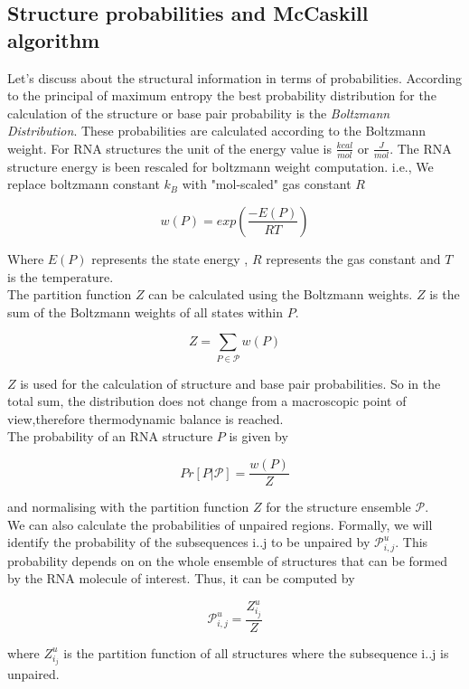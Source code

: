 \documentclass[twoside,a4paper]{report}
\begin{document}
 	 \subsection{Structure probabilities and McCaskill algorithm}
 	 Let's discuss about the structural information in terms of probabilities. According to the principal of maximum entropy \citep{jaynes1957information} the best probability distribution for the calculation of the structure or base pair probability is the \textit{Boltzmann Distribution}. These probabilities are calculated according to the Boltzmann weight. For RNA structures the unit of the energy value is $\frac{kcal}{mol}$ or $\frac{J}{mol}$. The RNA structure energy is been rescaled for boltzmann weight computation. i.e., We replace boltzmann constant $k_B$ with "mol-scaled" gas constant $R$\\
 	 
 	 \begin{center}	 
 	 \[ 
 	 w(P)= exp\left( \frac{-E(P)}{RT} \right)
 	 \]
 	 \end{center}
 	 
 	 Where $E(P)$ represents the state energy , $R $ represents the gas constant and $T$ is the temperature.\\
 	 The partition function $Z$ can be calculated using the Boltzmann weights. $Z$ is the sum of the Boltzmann weights of all states within $P$. \\
 	 \begin{center}	 
 	 	\[ 
 	 	Z= \sum_{P \in \mathcal{P}} w(P)
 	 	\]
 	 \end{center}
 	 
 	 $Z$ is used for the calculation of structure and base pair probabilities. So in the total sum, the distribution does not change from a macroscopic point of view,therefore thermodynamic balance is reached.\\
 	 The probability of an RNA structure $P$ is given by \\  
 	  \begin{center}	 
 	 	\[ 
 	 Pr[P|\mathcal{P}] = \frac{w(P)}{Z} 
 	 	\]
 	 \end{center}
  	 and normalising with the partition function $Z$ for the structure ensemble $\mathcal{P}$.  \\
  	
  	 We can also calculate the probabilities of unpaired regions. Formally, we will identify the probability of the subsequences i..j to be unpaired by $\mathcal{P}_{i,j}^{u}$. This probability depends on  on the whole ensemble of structures that can be formed by the RNA molecule of interest. Thus, it can be computed by\\
     \begin{center}	 
     	\[ 
     	\mathcal{P}_{i,j}^{u} = \frac{Z^u_{i_j}}{Z}
     	\]
     \end{center}
 	 where $Z^u_{i_j}$ is the partition function of all structures where the subsequence i..j is unpaired.\\
 	 
\end{document}
